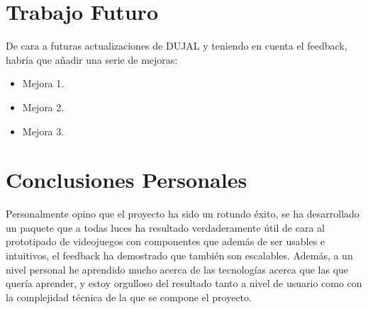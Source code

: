 \section{Trabajo Futuro}

De cara a futuras actualizaciones de DUJAL y teniendo en cuenta el feedback, habría que añadir una serie de mejoras: 
\begin{itemize}
    \item Mejora 1.
    \item Mejora 2.
    \item Mejora 3.
\end{itemize}

\section{Conclusiones Personales}
Personalmente opino que el proyecto ha sido un rotundo éxito, se ha desarrollado un paquete que a todas luces ha resultado verdaderamente útil de cara al prototipado de
 videojuegos con componentes que además de ser usables e intuitivos, el feedback ha demostrado que también son escalables. Además, a un nivel personal he aprendido mucho acerca
  de las tecnologías acerca que las que quería aprender, y estoy orgulloso del resultado tanto a nivel de usuario como con la complejidad técnica de la que se compone el proyecto. 